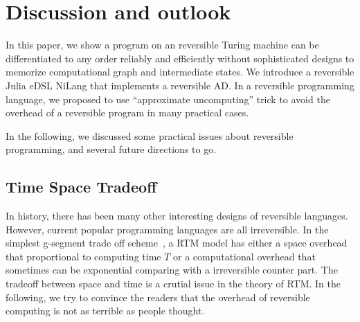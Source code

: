 \documentclass[aps,twocolumn,longbibliography,english,superscriptaddress]{revtex4-1}
\newcommand{\<}{\langle}
\renewcommand{\>}{\rangle}
\theoremstyle{definition}\newtheorem{definition}{\textit{Definition}}
\begin{document}
\section{Discussion and outlook}\label{sec:discussion}
In this paper, we show a program on an reversible Turing machine can be differentiated to any order reliably and efficiently without sophisticated designs to memorize computational graph and intermediate states. 
We introduce a reversible Julia eDSL NiLang that implements a reversible AD. In a reversible programming language, we proposed to use ``approximate uncomputing'' trick to avoid the overhead of a reversible program in many practical cases.

In the following, we discussed some practical issues about reversible programming, and several future directions to go.

\subsection{Time Space Tradeoff}\label{sec:timespace}
In history, there has been many other interesting designs of reversible languages. However, current popular programming languages are all irreversible.
In the simplest g-segment trade off scheme~\cite{Bennett1989,Levine1990}, a RTM model has either a space overhead that proportional to computing time $T$ or a computational overhead that sometimes can be exponential comparing with a irreversible counter part.
The tradeoff between space and time is a crutial issue in the theory of RTM.
In the following, we try to convince the readers that the overhead of reversible computing is not as terrible as people thought.
\end{document}

